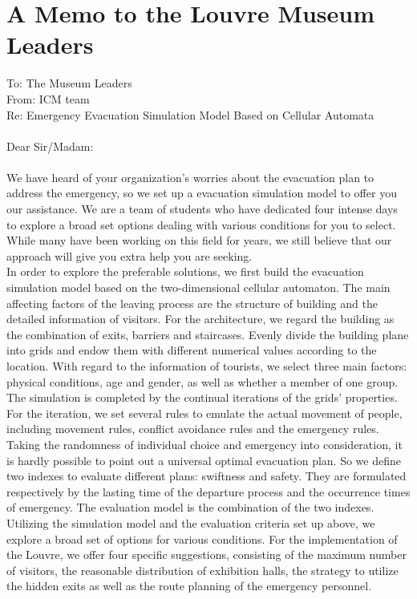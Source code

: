 \documentclass{mcmthesis}
\begin{document}
\section{A Memo to the Louvre Museum Leaders}
To: The Museum Leaders\\
From: ICM team \\
Re: Emergency Evacuation Simulation Model Based on Cellular Automata \\\\
Dear Sir/Madam:\\\\
\indent We have heard of your organization's worries about the evacuation plan to address the emergency, so we set up a evacuation simulation model to offer you our assistance. We are a team of students who have dedicated four intense days to explore a broad set options dealing with various conditions for you to select. While many have been working on this field for years, we still believe that our approach will give you extra help you are seeking.\\
\indent In order to explore the preferable solutions, we first build the evacuation simulation model based on the two-dimensional cellular automaton. The main affecting factors of the leaving process are the structure of building and the detailed information of visitors. For the architecture, we regard the building as the combination of exits, barriers and staircases. Evenly divide the building plane into grids and endow them with different numerical values according to the location. With regard to the information of tourists, we select three main factors: physical conditions, age and gender, as well as whether a member of one group. The simulation is completed by the continual iterations of the grids' properties. For the iteration, we set several rules to emulate the actual movement of people, including movement rules, conflict avoidance rules and the emergency rules. \\
\indent Taking the randomness of individual choice and emergency into consideration, it is hardly possible to point out a universal optimal evacuation plan. So we define two indexes to evaluate different plans: swiftness and safety. They are formulated respectively by the lasting time of the departure process and the occurrence times of emergency. The evaluation model is the combination of the two indexes. \\
\indent Utilizing the simulation model and the evaluation criteria set up above, we explore a broad set of options for various conditions. For the implementation of the Louvre, we offer four specific suggestions, consisting of the maximum number of visitors, the reasonable distribution of exhibition halls, the strategy to utilize the hidden exits as well as the route planning of the emergency personnel. \\
\end{document}
